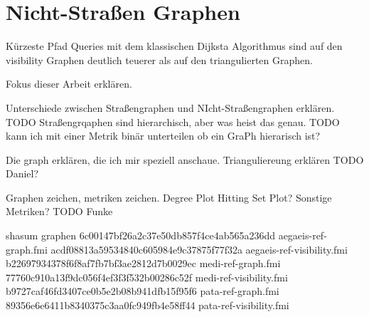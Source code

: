 \chapter{Nicht-Straßen Graphen}



Kürzeste Pfad Queries mit dem klassischen Dijksta Algorithmus sind auf den visibility Graphen deutlich teuerer als auf den triangulierten Graphen.


Fokus dieser Arbeit erklären.

Unterschiede zwischen Straßengraphen und NIcht-Straßengraphen erklären.
TODO Straßengrqaphen sind hierarchisch, aber was heist das genau.
TODO kann ich mit einer Metrik binär unterteilen ob ein GraPh hierarisch ist?

Die graph erklären, die ich mir speziell anschaue.
Trianguliereung erklären TODO Daniel?

Graphen zeichen, metriken zeichen.
Degree Plot
Hitting Set Plot?
Sonstige Metriken? TODO Funke


shasum graphen
6c00147bf26a2c37e50db857f4ce4ab565a236dd  aegaeis-ref-graph.fmi
acdf08813a59534840c605984e9c37875f77f32a  aegaeis-ref-visibility.fmi
b22697934378f6f8af7fb7bf3ae2812d7b0029ec  medi-ref-graph.fmi
77760c910a13f9dc056f4ef3f3f532b00286c52f  medi-ref-visibility.fmi
b9727caf46fd3407ce0b5e2b08b941dfb15f95f6  pata-ref-graph.fmi
89356e6e6411b8340375c3aa0fc949fb4e58ff44  pata-ref-visibility.fmi
